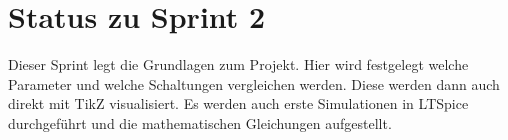 \section{Status zu Sprint 2
}\label{sec:status}

Dieser Sprint legt die Grundlagen zum Projekt. 
Hier wird festgelegt welche Parameter und welche Schaltungen vergleichen werden.
Diese werden dann auch direkt mit TikZ visualisiert.
Es werden auch erste Simulationen in LTSpice durchgeführt und die mathematischen Gleichungen aufgestellt.

